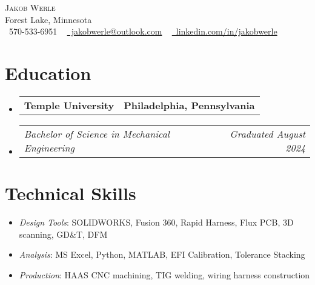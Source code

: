 \documentclass[letterpaper,11pt]{article}
\makeatletter
\newcommand{\company}[2]{
  \vspace{-2pt}\item
  \begin{tabular*}{1.0\textwidth}[t]{l@{\extracolsep{\fill}}r}
    \textbf{#1} & \textbf{\small #2} \\
  \end{tabular*}\vspace{-18pt}
}
\newcommand{\role}[2]{
  \vspace{-5pt}\item
  \begin{tabular*}{1.0\textwidth}[t]{l@{\extracolsep{\fill}}r}
    \textit{\small#1} & \textit{\small #2} \\
  \end{tabular*}\vspace{-20pt}
}
\newcommand{\resumeItemListStart}{
  \begin{itemize}[label=\tiny$\bullet$, leftmargin=0.25in] %
}
\newcommand{\resumeItemListEnd}{
  \end{itemize}\vspace{-5pt}
}
\newcommand{\resumeItem}[1]{
  \item\small{#1 \vspace{-2pt}}
}
\newcommand{\companyListStart}{
  \begin{itemize}[leftmargin=0.0in, label={}]
}
\newcommand{\companyListEnd}{
  \end{itemize}
}
\makeatother
\begin{document}
\begin{center}
    {\Huge \scshape Jakob Werle} \\ \vspace{1pt}
    Forest Lake, Minnesota \\ \vspace{1pt}
    \small \raisebox{-0.1\height}\faPhone\ 570-533-6951 ~ \href{mailto:jakobwerle@outlook.com}{\raisebox{-0.2\height}\faEnvelope\ jakobwerle@outlook.com} ~ 
    \href{https://linkedin.com/in/jakobwerle}{\raisebox{-0.2\height}\faLinkedin\ linkedin.com/in/jakobwerle}
    \vspace{-8pt}
\end{center}

\section{Education}
  \companyListStart
    \company{Temple University}{Philadelphia, Pennsylvania}
      \role{Bachelor of Science in Mechanical Engineering}{Graduated August 2024}
  \companyListEnd
\vspace{-12pt}

\section{Technical Skills}
    \resumeItemListStart
        \resumeItem{\textit{Design Tools}{: SOLIDWORKS, Fusion 360, Rapid Harness, Flux PCB, 3D scanning, GD\&T}, DFM} \vspace{-5pt}
        \resumeItem{\textit{Analysis}{: MS Excel, Python, MATLAB, EFI Calibration, Tolerance Stacking}}
        \vspace{-5pt}
        \resumeItem{\textit{Production}{: HAAS CNC machining, TIG welding, wiring harness construction}}
    \resumeItemListEnd
 \vspace{-16pt}

\end{document}
